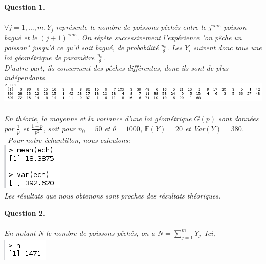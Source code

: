 \documentclass[a4paper,11pt]{article}
\newtheorem{exo2}{Question}
\begin{document}
\begin{exo2} \ \\ \\
    $\forall j = 1,...,m , Y_{j}$ représente le nombre de poissons pêchés entre le $j^{eme}$
    poisson bagué et le $(j+1)^{eme}$.
On répète successivement l'expérience "on pêche un poisson" jusqu'à ce qu'il soit bagué,
de probabilité $\frac{n_0}{\theta}$. Les $Y_i$ suivent donc tous une loi géométrique de paramètre
$\frac{n_0}{\theta}$.\ \\D'autre part, ils concernent des pêches différentes, donc ils sont
de plus indépendants.\ \\
\includegraphics[scale=0.5]{images/Q2_1_1.png}
\\ \\
En théorie, la moyenne et la variance d'une loi géométrique $G(p)$ sont données par $\frac{1}{p}$ et $\frac{1-p}{p^2}$, soit pour $n_0 = 50$ et $\theta = 1000$, $\mathbb{E}(Y) = 20$ et Var$(Y) = 380$. \ 
Pour notre échantillon, nous calculons:\ \\
\includegraphics[scale=0.5]{images/Q2_1_2.png} \ \\
Les résultats que nous obtenons sont proches des résultats théoriques.
\end{exo2}

\begin{exo2} \ \\ \\
En notant N le nombre de poissons pêchés, on a $N = \sum\limits_{j=1}^{m} Y_j$\
Ici,\ \\
\includegraphics[scale=0.5]{images/Q2_2.png} \ \\
\end{exo2}
\end{document}
